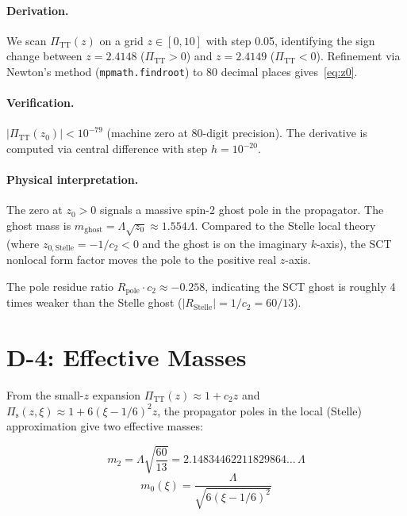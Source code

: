 \documentclass[11pt,a4paper]{article}
\newcommand{\PiTT}{\Pi_{\mathrm{TT}}}
\newcommand{\Pis}{\Pi_{\mathrm{s}}}
\begin{document}
\paragraph{Derivation.}
We scan $\PiTT(z)$ on a grid $z \in [0, 10]$ with step 0.05, identifying
the sign change between $z = 2.4148$ ($\PiTT > 0$) and $z = 2.4149$
($\PiTT < 0$).  Refinement via Newton's method (\texttt{mpmath.findroot})
to 80 decimal places gives~\eqref{eq:z0}.

\paragraph{Verification.}
$|\PiTT(z_0)| < 10^{-79}$ (machine zero at 80-digit precision).
The derivative is computed via central difference with step $h = 10^{-20}$.

\paragraph{Physical interpretation.}
The zero at $z_0 > 0$ signals a massive spin-2 ghost pole in the propagator.
The ghost mass is $m_{\mathrm{ghost}} = \Lambda\sqrt{z_0} \approx 1.554\Lambda$.
Compared to the Stelle local theory (where $z_{0,\text{Stelle}} = -1/c_2 < 0$
and the ghost is on the imaginary $k$-axis), the SCT nonlocal form factor
moves the pole to the positive real $z$-axis.

The pole residue ratio $R_\mathrm{pole} \cdot c_2 \approx -0.258$,
indicating the SCT ghost is roughly 4 times weaker than the Stelle ghost
($|R_\mathrm{Stelle}| = 1/c_2 = 60/13$).


\section{D-4: Effective Masses}
\label{sec:masses}

From the small-$z$ expansion $\PiTT(z) \approx 1 + c_2 z$ and
$\Pis(z,\xi) \approx 1 + 6(\xi - 1/6)^2 z$, the propagator poles in the
local (Stelle) approximation give two effective masses:

\begin{equation}\label{eq:m2}
  \boxed{m_2 = \Lambda\sqrt{\frac{60}{13}} = 2.14834462211829864\ldots\,\Lambda}
\end{equation}
\begin{equation}\label{eq:m0}
  \boxed{m_0(\xi) = \frac{\Lambda}{\sqrt{6(\xi - 1/6)^2}}}
\end{equation}
\end{document}
